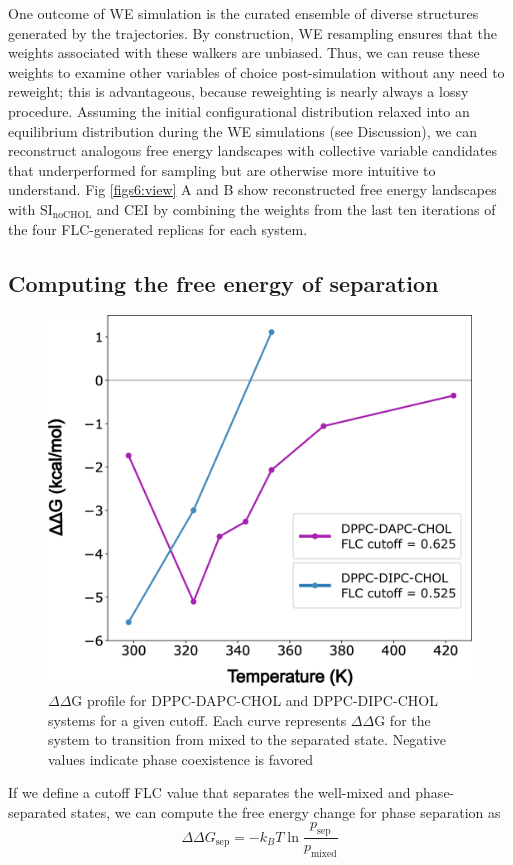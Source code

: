 \documentclass{biophys-new}
\begin{document}
One outcome of WE simulation is the curated ensemble of diverse structures generated by the trajectories.
By construction, WE resampling ensures that the weights associated with these walkers are unbiased.
Thus, we can reuse these weights to examine other variables of choice post-simulation without any need to reweight; this is advantageous, because reweighting is nearly always a lossy procedure.
Assuming the initial configurational distribution relaxed into an equilibrium distribution during the WE simulations (see Discussion), 
we can reconstruct analogous free energy landscapes with collective variable candidates that underperformed for sampling but are otherwise more intuitive to understand.
Fig \ref{figs6:view} A and B show reconstructed free energy landscapes with $\text{SI}_{\text{noCHOL}}$ and CEI by combining the weights from the last ten iterations of the four FLC-generated replicas for each system.

\subsection*{Computing the free energy of separation}

\begin{figure}[hbt!]
\centering
\includegraphics[width=0.5\linewidth]{Figures/Main/7/placeholder.jpg}
\caption{$\Delta\Delta$G profile for DPPC-DAPC-CHOL and DPPC-DIPC-CHOL systems for a given cutoff. Each curve represents $\Delta\Delta$G for the system to transition from mixed to the separated state. Negative values indicate phase coexistence is favored}
\label{figs7:view}
\end{figure}

If we define a cutoff FLC value that separates the well-mixed and phase-separated states, we can compute the free energy change for phase separation as 
\begin{equation}
    \Delta \Delta G_{\text{sep}} = -k_B T \ln \frac{p_{\text{sep}}}{p_{\text{mixed}}}
\end{equation}
\end{document}
